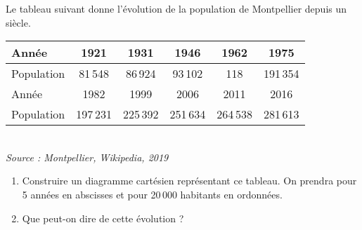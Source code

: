\begin{colonne*exercice}
\begin{exercice}
   Le tableau suivant donne l'évolution de la population de Montpellier depuis un siècle.
   \begin{center}
   {\small
      \begin{tabular}{|p{1.5cm}|*{5}{C{0.9}|}}
      \hline
      Année & 1921 & 1931 & 1946 & 1962 & 1975 \\
      \hline
      Population & 81\,548 & 86\,924 & 93\,102 & 118 & 191\,354 \\
      \hline
      Année & 1982 & 1999 & 2006 & 2011 & 2016 \\
      \hline
      Population & 197\,231 & 225\,392 & 251\,634 & 264\,538 & 281\,613 \\
      \hline
   \end{tabular} \\ [2mm]
   \hfill {\scriptsize\it Source : Montpellier, Wikipedia, 2019}}
   \end{center}
   \begin{enumerate}
      \item Construire un diagramme cartésien représentant ce tableau. On prendra  pour 5 années en abscisses et  pour 20\,000 habitants en ordonnées.
      \item Que peut-on dire de cette évolution ?
   \end{enumerate}
\end{exercice}

\end{colonne*exercice}


\Recreation


